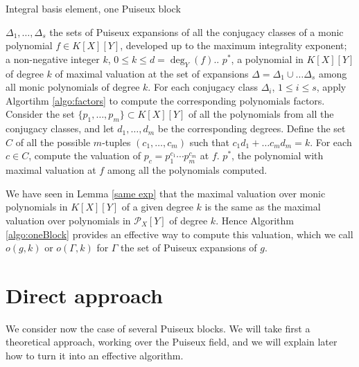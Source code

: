 \documentclass[a4paper,11pt]{amsart}%
\theoremstyle{definition}
\theoremstyle{plain}
\theoremstyle{remark}
\newcommand{\Px}{{\mathcal{P}_X}}
\begin{document}
\begin{algorithm}[h]                      %
\caption{Integral basis element, one Puiseux block}          %
\label{algo:oneBlock}
\begin{algorithmic}[1]
\REQUIRE $\Delta_1, \dots, \Delta_s$ the sets of Puiseux expansions of all the conjugacy classes of a monic polynomial $f \in K[X][Y]$, developed up to the maximum integrality exponent; a non-negative integer $k$, $0 \leq k \leq d = \deg_Y(f)$..
\ENSURE $p^{*}$, a polynomial in $K[X][Y]$ of degree $k$ of maximal valuation at the set of expansions $\Delta = \Delta_1 \cup \dots \Delta_s$ among all monic polynomials of degree $k$.
\STATE For each conjugacy class $\Delta_i$, $1 \le i \le s$, apply Algortihm \ref{algo:factors} to compute the corresponding polynomials factors.
\STATE Consider the set $\{p_1, \dots, p_m\} \subset K[X][Y]$ of all the polynomials from all the conjugacy classes, and let $d_1, \dots, d_m$ be the corresponding degrees.
\STATE Define the set $C$ of all the possible $m$-tuples $(c_1, \dots, c_m)$ such that $c_1 d_1  + \dots c_m d_m = k$.
\STATE For each $c \in C$, compute the valuation of $p_c = p_1^{c_1}\cdots p_m^{c_m}$ at $f$.
\RETURN $p^{*}$, the polynomial with maximal valuation at $f$ among all the polynomials computed.
\end{algorithmic}
\end{algorithm}


We have seen in Lemma \ref{same exp} that the maximal valuation over monic polynomials in $K[X][Y]$ of a given degree $k$ is the same as the maximal valuation over polynomials in $\Px[Y]$ of degree $k$. Hence Algorithm \ref{algo:oneBlock} provides an effective way to compute this valuation, which we call $o(g,k)$ or $o(\Gamma, k)$ for $\Gamma$ the set of Puiseux expansions of $g$.


\section{Direct approach}
\label{section:directApproach}


We consider now the case of several Puiseux blocks.
We will take first a theoretical approach, working over the Puiseux field, and we will explain later how to turn it into an effective algorithm.
\end{document}
